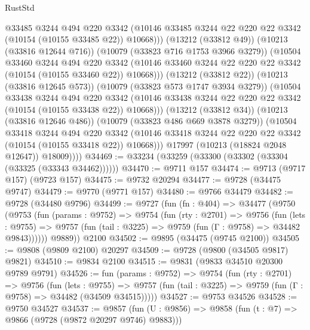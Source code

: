 \begin{lexlean}{RustStd}
\begin{coremodule}
                      @33485
                      @3244
                      @494
                      @220
                      @3342
                      (@10146 @33485 @3244 @22 @220 @22 @3342 (@10154 (@10155 @33485 @22)) @10668)))
                  (@13212 (@33812 @49))
                  (@10213 (@33816 @12644 @716))
                  (@10079 (@33823 @716 @1753 @3966 @3279))
                  (@10504
                    @33460
                    @3244
                    @494
                    @220
                    @3342
                    (@10146 @33460 @3244 @22 @220 @22 @3342 (@10154 (@10155 @33460 @22)) @10668)))
                (@13212 (@33812 @22))
                (@10213 (@33816 @12645 @573))
                (@10079 (@33823 @573 @1747 @3934 @3279))
                (@10504
                  @33438
                  @3244
                  @494
                  @220
                  @3342
                  (@10146 @33438 @3244 @22 @220 @22 @3342 (@10154 (@10155 @33438 @22)) @10668)))
              (@13212 (@33812 @34))
              (@10213 (@33816 @12646 @486))
              (@10079 (@33823 @486 @669 @3878 @3279))
              (@10504
                @33418
                @3244
                @494
                @220
                @3342
                (@10146 @33418 @3244 @22 @220 @22 @3342 (@10154 (@10155 @33418 @22)) @10668)))
            @17997
            (@10213 (@18824 @2048 @12647))
            @18009))))
@34469 := @33234 (@33259 (@33300 (@33302 (@33304 (@33325 (@33343 @34462))))))
@34470 := @9711 @157
@34474 := @9713 (@9717 @157) (@9723 @157)
@34475 := @9732 @20294
@34477 := @9728 (@34475 @9747)
@34479 := @9770 (@9771 @157)
@34480 := @9766 @34479
@34482 := @9728 (@34480 @9796)
@34499 := @9727
    (fun (fn : @404) =>
    @34477
      (@9750
        (@9753
          (fun (params : @9752) =>
          @9754
            (fun (rty : @2701) =>
            @9756
              (fun (lets : @9755) =>
              @9757 (fun (tail : @3225) => @9759 (fun (Γ : @9758) => @34482 @9843))))))
        @9889))
    @2100
@34502 := @9895 (@34475 (@9745 @2100))
@34505 := @9808 (@9809 @2100) @20297
@34509 := @9728 (@9800 (@34505 @9817) @9821)
@34510 := @9834 @2100
@34515 := @9831 (@9833 @34510 @20300 @9789 @9791)
@34526 := fun (params : @9752) =>
  @9754
    (fun (rty : @2701) =>
    @9756
      (fun (lets : @9755) =>
      @9757 (fun (tail : @3225) => @9759 (fun (Γ : @9758) => @34482 (@34509 @34515)))))
@34527 := @9753 @34526
@34528 := @9750 @34527
@34537 := @9857
    (fun (U : @9856) => @9858 (fun (t : @7) => @9866 (@9728 (@9872 @20297 @9746) @9883)))

\end{coremodule}
\end{lexlean}
